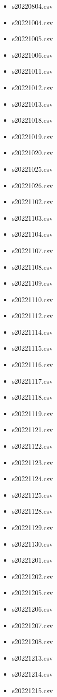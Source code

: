 \documentclass[a4paper,12pt,twoside]{book}
\begin{document}
\begin{itemize}
  \item s20220804.csv
  \item s20221004.csv
  \item s20221005.csv
  \item s20221006.csv
  \item s20221011.csv
  \item s20221012.csv
  \item s20221013.csv
  \item s20221018.csv
  \item s20221019.csv
  \item s20221020.csv
  \item s20221025.csv
  \item s20221026.csv
  \item s20221102.csv
  \item s20221103.csv
  \item s20221104.csv
  \item s20221107.csv
  \item s20221108.csv
  \item s20221109.csv
  \item s20221110.csv
  \item s20221112.csv
  \item s20221114.csv
  \item s20221115.csv
  \item s20221116.csv
  \item s20221117.csv
  \item s20221118.csv
  \item s20221119.csv
  \item s20221121.csv
  \item s20221122.csv
  \item s20221123.csv
  \item s20221124.csv
  \item s20221125.csv
  \item s20221128.csv
  \item s20221129.csv
  \item s20221130.csv
  \item s20221201.csv
  \item s20221202.csv
  \item s20221205.csv
  \item s20221206.csv
  \item s20221207.csv
  \item s20221208.csv
  \item s20221213.csv
  \item s20221214.csv
  \item s20221215.csv
\end{itemize}
\end{document}
